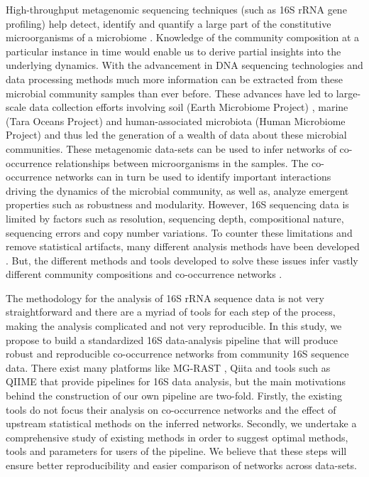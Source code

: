   High-throughput metagenomic sequencing techniques (such as 16S rRNA gene profiling) help detect, identify and quantify a large part of the constitutive microorganisms of a microbiome \cite{Jovel2016}.
  Knowledge of the community composition at a particular instance in time would enable us to derive partial insights into the underlying dynamics.
  With the advancement in DNA sequencing technologies \cite{Narihiro2017} and data processing methods much more information can be extracted from these microbial community samples than ever before.
  These advances have led to large-scale data collection efforts involving soil (Earth Microbiome Project) \cite{Thompson2017}, marine (Tara Oceans Project) \cite{Zhang2015} and human-associated microbiota (Human Microbiome Project) \cite{HumanMicrobiomeProjectConsortium2012} and thus led the generation of a wealth of data about these microbial communities.
  These metagenomic data-sets can be used to infer networks of co-occurrence relationships between microorganisms in the samples.
  The co-occurrence networks can in turn be used to identify important interactions driving the dynamics of the microbial community, as well as, analyze emergent properties such as robustness and modularity.
  However, 16S sequencing data is limited by factors such as resolution, sequencing depth, compositional nature, sequencing errors and copy number variations.
  To counter these limitations and remove statistical artifacts, many different analysis methods have been developed \cite{Callahan2016,Amir2017,Friedman2012,Kurtz2015}.
  But, the different methods and tools developed to solve these issues infer vastly different community compositions and co-occurrence networks \cite{Golob2017,Weiss2016}.

  The methodology for the analysis of 16S rRNA sequence data is not very straightforward and there are a myriad of tools for each step of the process, making the analysis complicated and not very reproducible.
  In this study, we propose to build a standardized 16S data-analysis pipeline that will produce robust and reproducible co-occurrence networks from community 16S sequence data. 
  There exist many platforms like MG-RAST \cite{Keegan2016}, Qiita \cite{qiita} and tools such as QIIME \cite{Caporaso2010} that provide pipelines for 16S data analysis, but the main motivations behind the construction of our own pipeline are two-fold.
  Firstly, the existing tools do not focus their analysis on co-occurrence networks and the effect of upstream statistical methods on the inferred networks.
  Secondly, we undertake a comprehensive study of existing methods in order to suggest optimal methods, tools and parameters for users of the pipeline.
  We believe that these steps will ensure better reproducibility and easier comparison of networks across data-sets.
